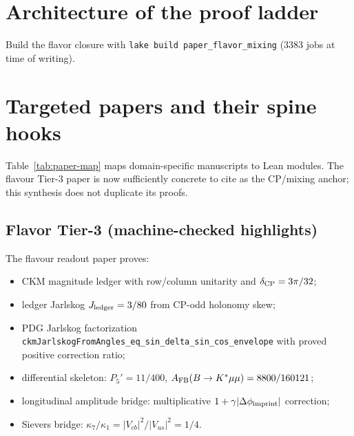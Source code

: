 \documentclass[11pt]{amsart}
\begin{document}
\section{Architecture of the proof ladder}
\begin{center}
\end{center}
Build the flavor closure with \texttt{lake build paper\_flavor\_mixing} (3383 jobs at time of writing).

\section{Targeted papers and their spine hooks}
Table~\ref{tab:paper-map} maps domain-specific manuscripts to Lean modules.
The flavour Tier-3 paper is now sufficiently concrete to cite as the CP/mixing anchor;
this synthesis does not duplicate its proofs.


\subsection{Flavor Tier-3 (machine-checked highlights)}
The flavour readout paper proves:
\begin{itemize}
\item CKM magnitude ledger with row/column unitarity and $\delta_{\rm CP}=3\pi/32$;
\item ledger Jarlskog $J_{\rm ledger}=3/80$ from CP-odd holonomy skew;
\item PDG Jarlskog factorization \texttt{ckmJarlskogFromAngles\_eq\_sin\_delta\_sin\_cos\_envelope}
  with proved positive correction ratio;
\item differential skeleton: $P_5'=11/400$, $A_{\rm FB}(B\to K^*\mu\mu)=8800/160121$;
\item longitudinal amplitude bridge: multiplicative $1+\gamma|\Delta\phi_{\rm imprint}|$ correction;
\item Sievers bridge: $\kappa_7/\kappa_1=|V_{cb}|^2/|V_{us}|^2=1/4$.
\end{itemize}
\end{document}
